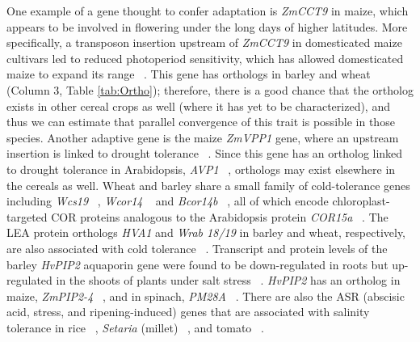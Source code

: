 \documentclass[12pt]{article}
\begin{document}
One example of a gene thought to confer adaptation is \textit{ZmCCT9} in maize, which appears to be involved in flowering under the long days of higher latitudes.
More specifically, a transposon insertion upstream of \textit{ZmCCT9} in domesticated maize cultivars led to reduced photoperiod sensitivity, which has allowed domesticated maize to expand its range ~\citep{Huang2017}. 
This gene has orthologs in barley and wheat (Column 3, Table \ref{tab:Ortho}); therefore, there is a good chance that the ortholog exists in other cereal crops as well (where it has yet to be characterized), and thus we can estimate that parallel convergence of this trait is possible in those species.
Another adaptive gene is the maize \textit{ZmVPP1} gene, where an upstream insertion is linked to drought tolerance ~\citep{Wang2016}.
Since this gene has an ortholog linked to drought tolerance in Arabidopsis, \textit{AVP1} ~\citep{Gaxiola2001}, orthologs may exist elsewhere in the cereals as well.
Wheat and barley share a small family of cold-tolerance genes including \textit{Wcs19} ~\citep{pmid8219063}, \textit{Wcor14} ~\citep{pmid10846621} and \textit{Bcor14b} ~\citep{pmid9952464}, all of which encode chloroplast-targeted COR proteins analogous to the Arabidopsis protein \textit{COR15a}  ~\citep{pmid9826741, Takumi2003}.
The LEA protein orthologs \textit{HVA1} and \textit{Wrab 18/19} in barley and wheat, respectively, are also associated with cold tolerance ~\citep{Hong1988, pmid16755132}.
Transcript and protein levels of the barley \textit{HvPIP2} aquaporin gene were found to be down-regulated in roots but up-regulated in the shoots of plants under salt stress ~\citep{Katsuhara2002}.
\textit{HvPIP2} has an ortholog in maize, \textit{ZmPIP2-4} ~\citep{Zhu2005}, and in spinach, \textit{PM28A} ~\citep{Fotiadis2000}.
There are also the ASR (abscisic acid, stress, and ripening-induced) genes that are associated with salinity tolerance in rice ~\citep{Joo2013}, \textit{Setaria} (millet) ~\citep{Li2017}, and tomato ~\citep{Konrad2008}.  
\end{document}
